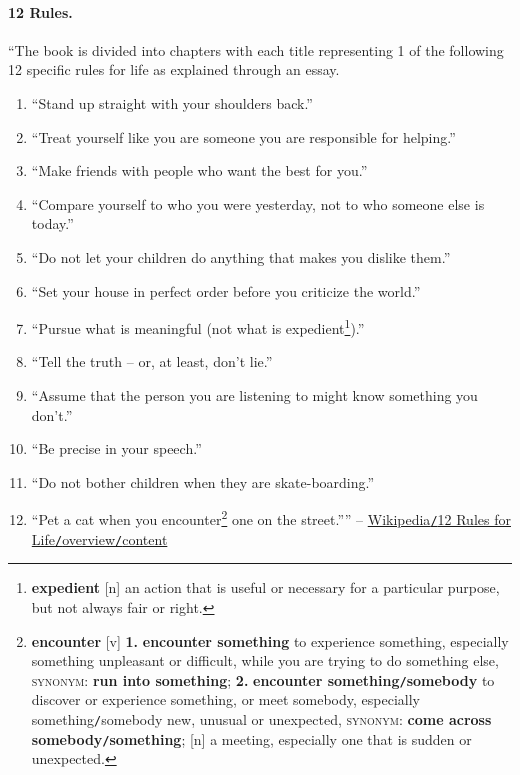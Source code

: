 \documentclass[oneside]{book}
\numberwithin{equation}{section}
\begin{document}
\paragraph*{12 Rules.} ``The book is divided into chapters with each title representing 1 of the following 12 specific rules for life as explained through an essay.
\begin{enumerate}
	\item ``Stand up straight with your shoulders back.''
	\item ``Treat yourself like you are someone you are responsible for helping.''
	\item ``Make friends with people who want the best for you.''
	\item ``Compare yourself to who you were yesterday, not to who someone else is today.''
	\item ``Do not let your children do anything that makes you dislike them.''
	\item ``Set your house in perfect order before you criticize the world.''
	\item ``Pursue what is meaningful (not what is expedient\footnote{\textbf{expedient} [n] an action that is useful or necessary for a particular purpose, but not always fair or right.}).''
	\item ``Tell the truth -- or, at least, don't lie.''
	\item ``Assume that the person you are listening to might know something you don't.''
	\item ``Be precise in your speech.''
	\item ``Do not bother children when they are skate-boarding.''
	\item ``Pet a cat when you encounter\footnote{\textbf{encounter} [v] \textbf{1.} \textbf{encounter something} to experience something, especially something unpleasant or difficult, while you are trying to do something else, \textsc{synonym}: \textbf{run into something}; \textbf{2.} \textbf{encounter something\texttt{/}somebody} to discover or experience something, or meet somebody, especially something\texttt{/}somebody new, unusual or unexpected, \textsc{synonym}: \textbf{come across somebody\texttt{/}something}; [n] a meeting, especially one that is sudden or unexpected.} one on the street.'''' -- \href{https://en.wikipedia.org/wiki/12_Rules_for_Life#12_Rules}{Wikipedia\texttt{/}12 Rules for Life\texttt{/}overview\texttt{/}content}
\end{enumerate} 
\end{document}
